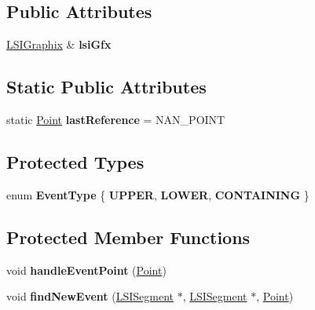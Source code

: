 \subsection*{Public Attributes}
\begin{DoxyCompactItemize}
\item 
\mbox{\label{classLineSegmentIntersector_a82113ff9c3ccbf2c276c67a45401430a}} 
\hyperlink{classLSIGraphix}{L\+S\+I\+Graphix} \& {\bfseries lsi\+Gfx}
\end{DoxyCompactItemize}
\subsection*{Static Public Attributes}
\begin{DoxyCompactItemize}
\item 
\mbox{\label{classLineSegmentIntersector_a170c7914f53e24387e8e46cedf3a1290}} 
static \hyperlink{classPoint}{Point} {\bfseries last\+Reference} = N\+A\+N\+\_\+\+P\+O\+I\+NT
\end{DoxyCompactItemize}
\subsection*{Protected Types}
\begin{DoxyCompactItemize}
\item 
\mbox{\label{classLineSegmentIntersector_a6a52c49fcc65bed18dbae1c5da533ded}} 
enum {\bfseries Event\+Type} \{ {\bfseries U\+P\+P\+ER}, 
{\bfseries L\+O\+W\+ER}, 
{\bfseries C\+O\+N\+T\+A\+I\+N\+I\+NG}
 \}
\end{DoxyCompactItemize}
\subsection*{Protected Member Functions}
\begin{DoxyCompactItemize}
\item 
\mbox{\label{classLineSegmentIntersector_a04879d41e0615b59ade2ac62f205a9a0}} 
void {\bfseries handle\+Event\+Point} (\hyperlink{classPoint}{Point})
\item 
\mbox{\label{classLineSegmentIntersector_a0936f7337dbe849cf74ef39293b14860}} 
void {\bfseries find\+New\+Event} (\hyperlink{classLineSegmentIntersector_1_1LSISegment}{L\+S\+I\+Segment} $\ast$, \hyperlink{classLineSegmentIntersector_1_1LSISegment}{L\+S\+I\+Segment} $\ast$, \hyperlink{classPoint}{Point})
\end{DoxyCompactItemize}

